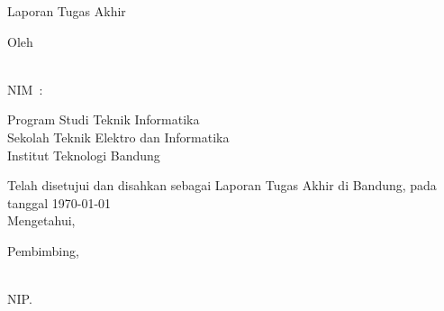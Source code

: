
\begin{center}
  \smallskip
  \thispagestyle{empty}
  \Large \bfseries \MakeUppercase{\thetitle}
  \vfill

  \normalsize Laporan Tugas Akhir
  \vfill

  \large Oleh
  
  \large \uppercase{\theauthor} \\
  \large NIM~:~\uppercase{\nim}

  \vfill

  \normalfont{}
  \normalsize Program Studi Teknik Informatika \\
  \normalsize Sekolah Teknik Elektro dan Informatika \\
  \normalsize Institut Teknologi Bandung \\
  \vfill

  \normalsize Telah disetujui dan disahkan sebagai Laporan Tugas Akhir di Bandung, pada tanggal \today \\
  \normalsize Mengetahui, \\
  \vfill

  Pembimbing,
  \vfill

  \underline{\supervisor{}} \\
  NIP.\@ \uppercase{\supervisornip{}} \\
  
\end{center}